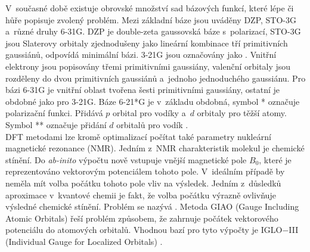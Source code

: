 \documentclass[
  printed, %
  table,   %
  lof,     %
  lot,     %
  oneside,
]{fithesis3}
\begin{document}
 V~současné době existuje obrovské množství sad bázových funkcí, které lépe či hůře popisuje zvolený problém. Mezi základní báze jsou uváděny DZP, STO-3G a~různé druhy 6-31G. DZP je double-zeta gaussovská báze s~polarizací, STO-3G jsou Slaterovy orbitaly zjednodušeny jako lineární kombinace tří primitivních gaussiánů, odpovídá minimální bázi. 3-21G jsou označovány jako . Vnitřní elektrony jsou popisovány třemi primitivními gaussiány, valenční orbitaly jsou rozděleny do dvou primitivních gaussiánů a~jednoho jednoduchého gaussiánu. Pro bázi 6-31G je vnitřní oblast tvořena šesti primitivními gaussiány, ostatní je obdobné jako pro 3-21G. Báze 6-21*G je v~základu obdobná, symbol * označuje polarizační funkci. Přidává $p$ orbital pro vodíky a~$d$ orbitaly pro těžší atomy. Symbol ** označuje přidání $d$ orbitalů pro vodík \cite{lowe2011quantum}. \\
 
 DFT metodami lze kromě optimalizací počítat také parametry nukleární magnetické rezonance (NMR). Jedním z~NMR charakteristik molekul je chemické stínění. Do \textit{ab-inito} výpočtu nově vstupuje vnější magnetické pole $B_0$, které je reprezentováno vektorovým potenciálem tohoto pole. V~ideálním případě by neměla mít volba počátku tohoto pole vliv na výsledek. Jedním z~důsledků aproximace v~kvantové chemii je fakt, že volba počátku výrazně ovlivňuje výsledné chemické stínění. Problém se nazývá . Metoda GIAO (Gauge  Including Atomic Orbitals) řeší problém způsobem, že zahrnuje počátek vektorového potenciálu do atomových orbitalů. Vhodnou bazí pro tyto výpočty je IGLO$-$III (Individual Gauge for Localized Orbitals) \cite{Standara2006thesis} \cite{g09}.
\end{document}
